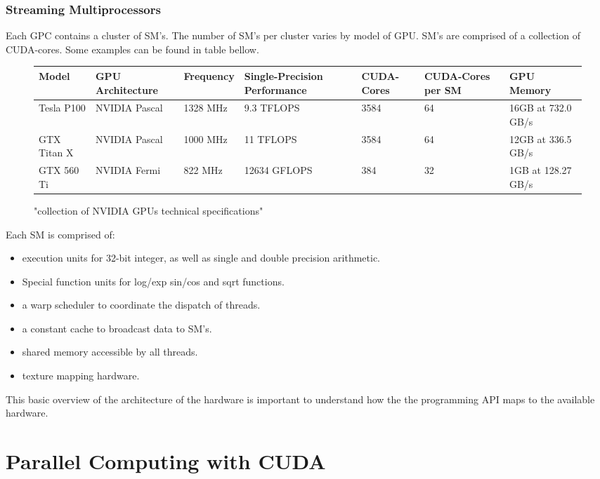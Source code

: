 \subsubsection{Streaming Multiprocessors}
Each GPC contains a cluster of SM's.  The number of SM's per cluster varies by
model of GPU. SM's are comprised of a collection of CUDA-cores.  Some examples
 can be found in table bellow.
\begin{figure}
\caption{"collection of NVIDIA \Glspl{GPU} technical specifications"}
\begin{center}\label{hardwareTable}
\begin{tabu} to 0.9\textwidth { | X[l] | X[c] | X[c] | X[c]| X[c]| X[c]| X[r] | }

 \hline
 Model & GPU Architecture &Frequency& Single-Precision Performance & CUDA-Cores & CUDA-Cores per SM & GPU Memory \\
 \hline
 Tesla P100 & NVIDIA Pascal &1328 MHz &9.3 TFLOPS & 3584 & 64 & 16GB at 732.0 GB/s\\
 \hline
 GTX Titan X & NVIDIA Pascal & 1000 MHz & 11 TFLOPS & 3584 & 64 & 12GB at 336.5 GB/s\\
 \hline
 GTX 560 Ti & NVIDIA Fermi & 822 MHz&12634 GFLOPS & 384 & 32  & 1GB at 128.27 GB/s\\
\hline
\end{tabu}
\end{center}

\end{figure}
Each SM is comprised of: \cite{Wilt}
\begin{itemize}
  \item execution units for 32-bit integer, as well as single and double precision arithmetic.
  \item Special function units for log/exp sin/cos and sqrt functions.
  \item a warp scheduler to coordinate the dispatch of threads.
  \item a constant cache to broadcast data to SM's.
  \item shared memory accessible by all threads.
  \item texture mapping hardware.
\end{itemize}

This basic overview of the architecture of the hardware is important to understand
how the the programming API maps to the available hardware.


\section{Parallel Computing with CUDA}
